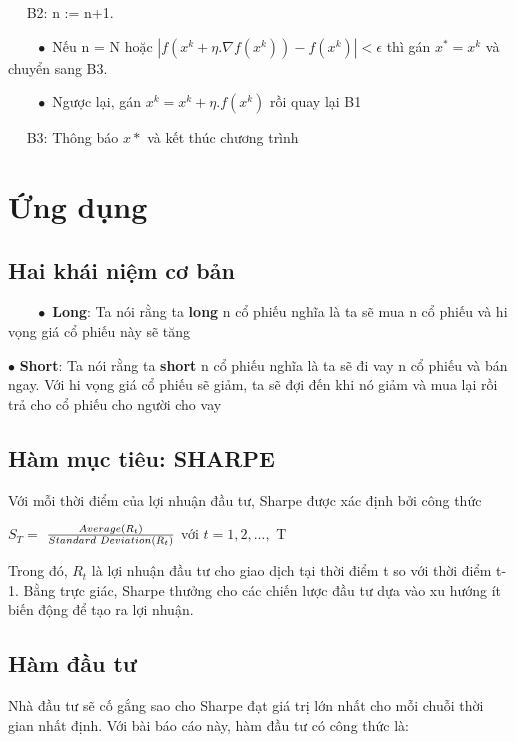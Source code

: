 \documentclass[14pt]{extreport}
\begin{document}
$\quad$ B2: n := n+1. 

$\quad \quad \bullet$ Nếu n = N hoặc $|f(x^k + \eta.\nabla f(x^k)) - f(x^k)| < \epsilon$ thì gán $x^* = x^k$ và chuyển sang B3.

$\quad \quad \bullet$ Ngược lại, gán $x^k = x^k + \eta.f(x^k)$ rồi quay lại B1

$\quad$ B3: Thông báo $x*$ và kết thúc chương trình



\chapter{Ứng dụng}

\section{Hai khái niệm cơ bản}

$\quad \quad \bullet$ \textbf{Long}: Ta nói rằng ta \textbf{long} n cổ phiếu nghĩa là ta sẽ mua n cổ phiếu và hi vọng giá cổ phiếu này sẽ tăng

$\bullet$ \textbf{Short}: Ta nói rằng ta \textbf{short} n cổ phiếu nghĩa là ta sẽ đi vay n cổ phiếu và bán ngay. Với hi vọng giá cổ phiếu sẽ giảm, ta sẽ đợi đến khi nó giảm và mua lại rồi trả cho cổ phiếu cho người cho vay


\section{Hàm mục tiêu: SHARPE}

Với mỗi thời điểm của lợi nhuận đầu tư, Sharpe được xác định bởi công thức


\begin{center}
$ S_T=$ {\Large $\frac{Average(R_t)}{Standard \hspace{0.1cm}  Deviation (R_t)}$} với $t =1,2,...,$ T  
\end{center}


Trong đó, $R_t$ là lợi nhuận đầu tư cho giao dịch tại thời điểm t so với thời điểm t-1. Bằng trực giác, Sharpe thưởng cho các chiến lược đầu tư dựa vào xu hướng ít biến động để tạo ra lợi nhuận.

\section{Hàm đầu tư}

Nhà đầu tư sẽ cố gắng sao cho Sharpe đạt giá trị lớn nhất cho mỗi chuỗi thời gian nhất định. Với bài báo cáo này, hàm đầu tư có công thức là:
\end{document}
